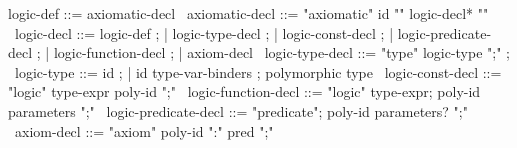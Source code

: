 \begin{syntax}
  logic-def ::= axiomatic-decl
  \
  axiomatic-decl ::= "axiomatic" id "{" logic-decl* "}"
  \
  logic-decl ::= logic-def ;
  | logic-type-decl ;
  | logic-const-decl ;
  | logic-predicate-decl ;
  | logic-function-decl ;
  | axiom-decl 
  \
  logic-type-decl ::= "type" logic-type ";" ;
  \
  logic-type ::= id ;
  | id type-var-binders ; polymorphic type
  \
  logic-const-decl ::=  "logic" type-expr poly-id ";"
  \
  logic-function-decl ::=
  "logic" type-expr;
  poly-id parameters ";"
  \
  logic-predicate-decl ::=
  "predicate";
  poly-id parameters? ";"
  \
  axiom-decl ::= "axiom" poly-id ":" pred ";" 
\end{syntax}